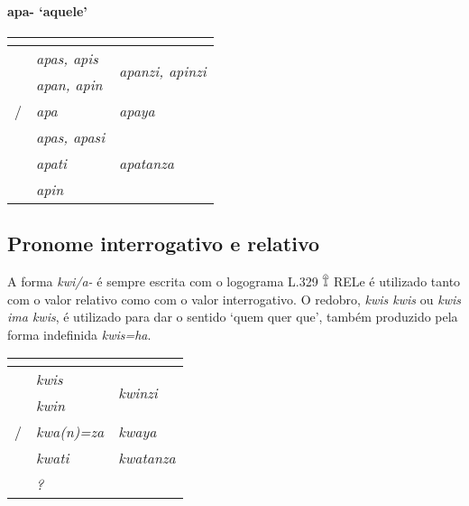 \paragraph{apa- `aquele'}

\begin{center}
	\begin{tabular}[c]{lll}
		\toprule
		                 & \Sg{}\emph{}       & \Pl{}\emph{}                             \\
		\midrule
		\Nom{} \Com{}    & \emph{apas, apis}  & \multirow{2}{4em}{\emph{apanzi, apinzi}} \\
		\Acu{} \Com{}    & \emph{apan, apin}  &                                          \\
		\Nom/\Acu\Neut{} & \emph{apa}         & \emph{apaya}                             \\
		\Gen{}           & \emph{apas, apasi} &                                          \\
		\Dat{}           & \emph{apati}       & \emph{apatanza}                          \\
		\Abl{}           & \emph{apin}        & \emph{}                                  \\
		\bottomrule
	\end{tabular}
\end{center}

\subsection{Pronome interrogativo e relativo}

A forma \emph{kwi\slash{}a-} é sempre escrita com o logograma L.329 𔕰 REL\@ e
é utilizado tanto com o valor relativo como com o valor interrogativo.
O redobro, \emph{kwis kwis} ou \emph{kwis ima kwis}, é utilizado para dar o
sentido `quem quer que', também produzido pela forma indefinida \emph{kwis=ha}.

\begin{center}
	\begin{tabular}[c]{lll}
		\toprule
		                 & \Sg{}\emph{}       & \Pl{}\emph{}                     \\
		\midrule
		\Nom{} \Com{}    & \emph{kwis}        & \multirow{2}{4em}{\emph{kwinzi}} \\
		\Acu{} \Com{}    & \emph{kwin}        &                                  \\
		\Nom/\Acu\Neut{} & \emph{kwa{(n)}=za} & \emph{kwaya}                     \\
		\Dat{}           & \emph{kwati}       & \emph{kwatanza}                  \\
		\Abl{}           & \emph{?}           & \emph{}                          \\
		\bottomrule
	\end{tabular}
\end{center}

